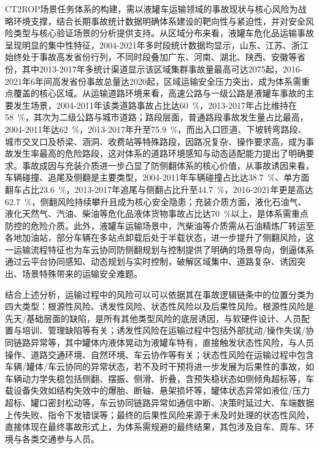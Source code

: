       CT2ROP场景任务体系的构建，需以液罐车运输领域的事故现状与核心风险为战略环境支撑，结合长期事故统计数据明确体系建设的靶向性与紧迫性，并对安全风险类型与核心验证场景的分析提供支持。从区域分布来看，液罐车危化品运输事故呈现明显的集中性特征，2004-2021年多时段统计数据均显示，山东、江苏、浙江始终处于事故高发省份行列，不同时段叠加广东、河南、湖北、陕西、安徽等省份，其中2013-2017年多统计渠道显示该区域集群事故量最高可达2075起，2016-2021年6年间高发省份事故总量达2020起，区域运输安全压力突出，成为体系需重点覆盖的核心区域。从运输道路环境来看，高速公路与一级公路是液罐车事故的主要发生场景，2004-2011年该类道路事故占比达\SI{60}{\percent}，2013-2017年占比维持在\SI{58}{\percent}，其次为二级公路与城市道路；路段层面，普通路段事故发生量占比最高，2004-2011年达\SI{62}{\percent}，2013-2017年升至\SI{75.9}{\percent}，而出入口匝道、下坡转弯路段、城市交叉口及桥梁、涵洞、收费站等特殊路段，因路况复杂、操作要求高，成为事故发生率最高的危险路段，这对体系的道路环境感知与动态适配能力提出了明确要求。事故成因与充装介质进一步凸显了防侧翻体系的核心价值，从事故诱因来看，车辆碰撞、追尾及侧翻是主要类型，2004-2011年车辆碰撞占比达\SI{38.7}{\percent}、单方面翻车占比\SI{23.6}{\percent}，2013-2017年追尾与侧翻占比升至\SI{44.7}{\percent}，2016-2021年更是高达\SI{62.7}{\percent}，侧翻风险持续攀升且成为核心安全隐患；充装介质方面，液化石油气、液化天然气、汽油、柴油等危化品液体货物事故占比达\SI{70}{\percent}以上，是体系需重点防控的危险介质。此外，液罐车运输场景中，汽柴油等介质需从石油精炼厂转运至各地加油站，部分车辆在多站点卸载后处于半载状态，进一步提升了侧翻风险，这一运输流程特征也为车云协同防侧翻规划与控制提供了明确的场景导向，倒逼体系通过云平台协同感知、动态规划与实时控制，破解区域集中、道路复杂、诱因突出、场景特殊带来的运输安全难题。 %

      结合上述分析，运输过程中的风险可以可以依据其在事故逻辑链条中的位置分类为四大类型：根源性风险、诱发性风险、状态性风险以及后果性风险。根源性风险是先天/基础层面的缺陷，是所有其他类型风险的底层诱因，与软硬件设计、人员配置与培训、管理缺陷等有关；诱发性风险在运输过程中包括外部扰动/操作失误/协同链路异常等，其中罐体内液体晃动为液罐车特有，直接触发状态性风险，与人员操作、道路交通环境、自然环境、车云协作等有关；状态性风险在运输过程中包含车辆/罐体/车云协同的异常状态，若不及时干预将进一步发展为后果性的事故，如车辆动力学失稳包括侧翻、摆振、侧滑、折叠，含预失稳状态如侧倾角超标等，车载设备失效如结构失效中的爆胎、断轴、悬架损坏等，罐体状态异常如液位/压力超标、罐口密封松动等，车云协同链路异常如通信中断、决策时延过大、车端数据上传失败、指令下发错误等；最终的后果性风险来源于未及时处理的状态性风险，直接体现在最终事故形式上，为体系需规避的最终结果，其包涉及自车、周车、环境与各类交通参与人员。


